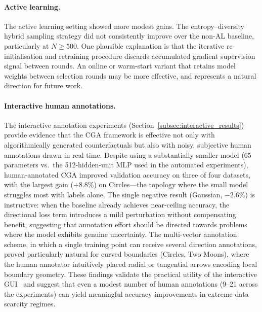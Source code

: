 \paragraph{Active learning.}
The active learning setting showed more modest gains. The entropy--diversity hybrid sampling strategy did not consistently improve over the non-AL baseline, particularly at $N \geq 500$. One plausible explanation is that the iterative re-initialisation and retraining procedure discards accumulated gradient supervision signal between rounds. An online or warm-start variant that retains model weights between selection rounds may be more effective, and represents a natural direction for future work.

\paragraph{Interactive human annotations.}
The interactive annotation experiments (Section~\ref{subsec:interactive_results}) provide evidence that the CGA framework is effective not only with algorithmically generated counterfactuals but also with noisy, subjective human annotations drawn in real time. Despite using a substantially smaller model (65 parameters vs.\ the 512-hidden-unit MLP used in the automated experiments), human-annotated CGA improved validation accuracy on three of four datasets, with the largest gain ($+8.8\%$) on Circles---the topology where the small model struggles most with labels alone. The single negative result (Gaussian, $-2.6\%$) is instructive: when the baseline already achieves near-ceiling accuracy, the directional loss term introduces a mild perturbation without compensating benefit, suggesting that annotation effort should be directed towards problems where the model exhibits genuine uncertainty. The multi-vector annotation scheme, in which a single training point can receive several direction annotations, proved particularly natural for curved boundaries (Circles, Two Moons), where the human annotator intuitively placed radial or tangential arrows encoding local boundary geometry. These findings validate the practical utility of the interactive GUI~\cite{erskine2024ijcai} and suggest that even a modest number of human annotations (9--21 across the experiments) can yield meaningful accuracy improvements in extreme data-scarcity regimes.


